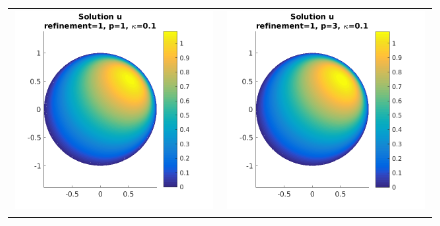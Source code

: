 \documentclass{article}
\begin{document}
\begin{figure}[!ht]
\begin{tabular}{c c}
\includegraphics[scale=0.7]{umu_122.png} & 
\includegraphics[scale=0.7]{umu_222.png} \\

\end{tabular}
\end{figure}
\end{document}

